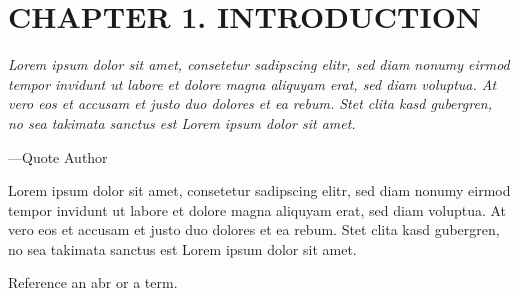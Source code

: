 \chapter{CHAPTER 1. INTRODUCTION}

\setlength{\RaggedRightParindent}{0in}

\epigraph{\itshape 
Lorem ipsum dolor sit amet, consetetur sadipscing elitr, sed diam nonumy eirmod tempor invidunt ut labore et dolore magna aliquyam erat, sed diam voluptua. At vero eos et accusam et justo duo dolores et ea rebum. Stet clita kasd gubergren, no sea takimata sanctus est Lorem ipsum dolor sit amet.
}{---Quote Author}

\setlength{\RaggedRightParindent}{0.5in}

Lorem ipsum dolor sit amet, consetetur sadipscing elitr, sed diam nonumy eirmod tempor invidunt ut labore et dolore magna aliquyam erat, sed diam voluptua. At vero eos et accusam et justo duo dolores et ea rebum. Stet clita kasd gubergren, no sea takimata sanctus est Lorem ipsum dolor sit amet.

Reference an \gls{abr} or a \gls{term}.
